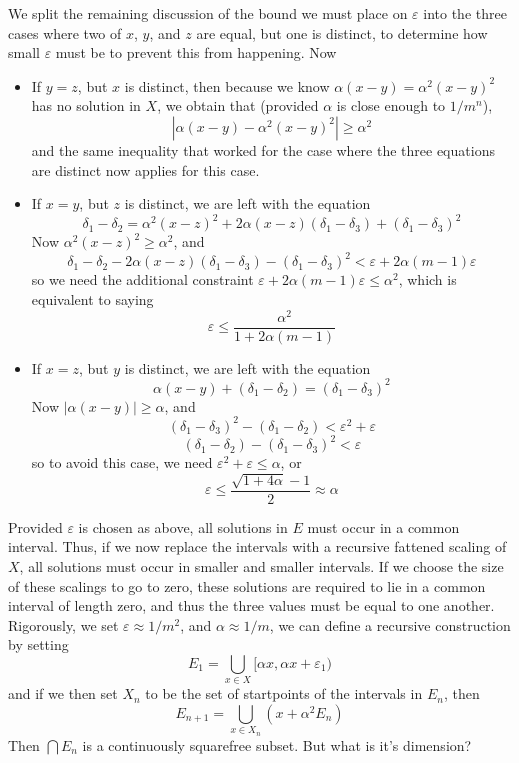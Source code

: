 \documentclass{article}
\theoremstyle{plain}
\theoremstyle{plain}
\begin{document}
We split the remaining discussion of the bound we must place on $\varepsilon$ into the three cases where two of $x$, $y$, and $z$ are equal, but one is distinct, to determine how small $\varepsilon$ must be to prevent this from happening. Now
%
\begin{itemize}
    \item If $y = z$, but $x$ is distinct, then because we know $\alpha(x - y) = \alpha^2(x - y)^2$ has no solution in $X$, we obtain that (provided $\alpha$ is close enough to $1/m^n$),
    \[ |\alpha(x - y) - \alpha^2(x-y)^2| \geq \alpha^2 \]
    and the same inequality that worked for the case where the three equations are distinct now applies for this case.

    \item If $x = y$, but $z$ is distinct, we are left with the equation
    \[ \delta_1 - \delta_2 = \alpha^2(x - z)^2 + 2\alpha(x - z)(\delta_1 - \delta_3) + (\delta_1 - \delta_3)^2 \]
    Now $\alpha^2(x - z)^2 \geq \alpha^2$, and
    \[ \delta_1 - \delta_2 - 2\alpha(x-z)(\delta_1 - \delta_3) - (\delta_1 - \delta_3)^2 < \varepsilon + 2\alpha(m-1)\varepsilon \]
    so we need the additional constraint $\varepsilon + 2\alpha(m-1)\varepsilon \leq \alpha^2$, which is equivalent to saying
    \[ \varepsilon \leq \frac{\alpha^2}{1 + 2\alpha(m-1)} \]

    \item If $x = z$, but $y$ is distinct, we are left with the equation
    \[ \alpha(x - y) + (\delta_1 - \delta_2) = (\delta_1 - \delta_3)^2 \]
    Now $|\alpha(x-y)| \geq \alpha$, and
    \[ (\delta_1 - \delta_3)^2 - (\delta_1 - \delta_2) < \varepsilon^2 + \varepsilon \]
    \[ (\delta_1 - \delta_2) - (\delta_1 - \delta_3)^2 < \varepsilon \]
    so to avoid this case, we need $\varepsilon^2 + \varepsilon \leq \alpha$, or
    \[ \varepsilon \leq \frac{\sqrt{1 + 4\alpha} - 1}{2} \approx \alpha \]
\end{itemize}
%
Provided $\varepsilon$ is chosen as above, all solutions in $E$ must occur in a common interval. Thus, if we now replace the intervals with a recursive fattened scaling of $X$, all solutions must occur in smaller and smaller intervals. If we choose the size of these scalings to go to zero, these solutions are required to lie in a common interval of length zero, and thus the three values must be equal to one another. Rigorously, we set $\varepsilon \approx 1/m^2$, and $\alpha \approx 1/m$, we can define a recursive construction by setting
%
\[ E_1 = \bigcup_{x \in X} [\alpha x, \alpha x + \varepsilon_1) \]
%
and if we then set $X_n$ to be the set of startpoints of the intervals in $E_n$, then
%
\[ E_{n+1} = \bigcup_{x \in X_n} (x + \alpha^2 E_n) \]
%
Then $\bigcap E_n$ is a continuously squarefree subset. But what is it's dimension?
\end{document}
